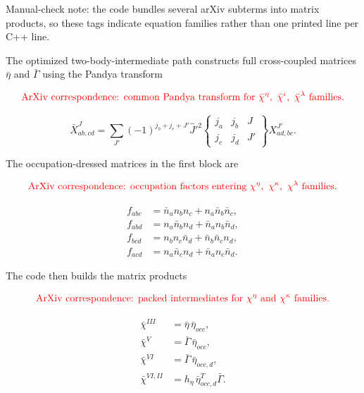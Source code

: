 \documentclass[
]{article}
\begin{document}
Manual-check note: the code bundles several arXiv subterms into matrix
products, so these tags indicate equation families rather than one
printed line per C++ line.

The optimized two-body-intermediate path constructs full cross-coupled
matrices \(\bar\eta\) and \(\bar\Gamma\) using the Pandya transform

\begin{equation}
{\color{red}\text{ArXiv correspondence: common Pandya transform for }\bar\chi^{\eta},\ \bar\chi^{\iota},\ \bar\chi^{\lambda}\text{ families.}}
\end{equation}

\begin{equation}
\bar X^J_{ab,cd}
=\sum_{J'}(-1)^{j_b+j_c+J'}\hat J'^2
\begin{Bmatrix} j_a&j_b&J\\ j_c&j_d&J'\end{Bmatrix}
X^{J'}_{ad,bc} .
\end{equation}

The occupation-dressed matrices in the first block are

\begin{equation}
{\color{red}\text{ArXiv correspondence: occupation factors entering }\chi^{\eta},\ \chi^{\kappa},\ \chi^{\lambda}\text{ families.}}
\end{equation}

\begin{equation}
\begin{aligned}
f_{abc} &= \bar n_a n_b n_c+n_a\bar n_b\bar n_c,\\
f_{abd} &= n_a\bar n_b n_d+\bar n_a n_b\bar n_d,\\
f_{bcd} &= n_b n_c\bar n_d+\bar n_b\bar n_c n_d,\\
f_{acd} &= n_a\bar n_c n_d+\bar n_a n_c\bar n_d .
\end{aligned}
\end{equation}

The code then builds the matrix products

\begin{equation}
{\color{red}\text{ArXiv correspondence: packed intermediates for }\chi^{\eta}\text{ and }\chi^{\kappa}\text{ families.}}
\end{equation}

\begin{equation}
\begin{aligned}
\bar\chi^{III} &= \bar\eta\,\bar\eta_{occ},\\
\bar\chi^{V} &= \bar\Gamma\,\bar\eta_{occ},\\
\bar\chi^{VI} &= \bar\Gamma\,\bar\eta_{occ,d},\\
\bar\chi^{VI,II} &= h_\eta\,\bar\eta_{occ,d}^{T}\bar\Gamma .
\end{aligned}
\end{equation}
\end{document}

